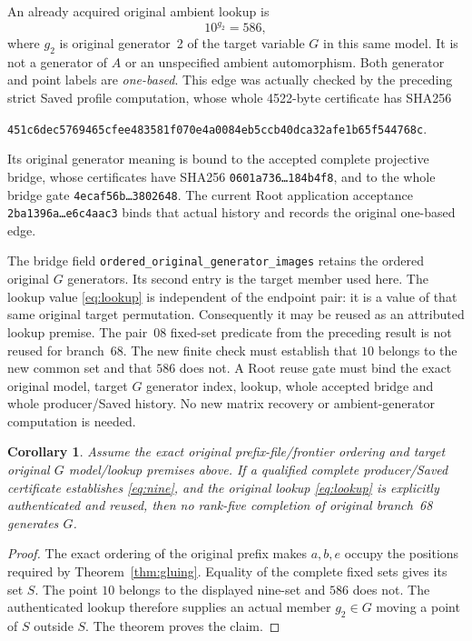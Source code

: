 \documentclass[11pt]{article}
\newtheorem{corollary}[theorem]{Corollary}
\begin{document}
An already acquired original ambient lookup is
\begin{equation}\label{eq:lookup}
            10^{g_2}=586,
\end{equation}
where $g_2$ is original generator~2 of the target variable $G$ in
this same model. It is not a generator of $A$ or an unspecified
ambient automorphism. Both generator
and point labels are \emph{one-based}. This edge was actually checked
by the preceding strict Saved profile computation, whose whole
4522-byte certificate has SHA256
\begin{center}\small
\texttt{451c6dec5769465cfee483581f070e4a0084eb5ccb40dca32afe1b65f544768c}.
\end{center}
Its original generator meaning is bound to the accepted complete
projective bridge, whose certificates have SHA256
\texttt{0601a736\ldots 184b4f8}, and to the whole bridge gate
\texttt{4ecaf56b\ldots 3802648}. The current Root application
acceptance \texttt{2ba1396a\ldots e6c4aac3} binds that actual
history and records the original one-based edge.

The bridge field \texttt{ordered\_original\_generator\_images}
retains the ordered original $G$ generators. Its second entry is
the target member used here. The lookup value \eqref{eq:lookup}
is independent of the endpoint pair: it is a value of that same
original target permutation.
Consequently it may be reused as an attributed lookup premise.
The pair~08 fixed-set predicate from the preceding result is not
reused for branch~68. The new finite check must establish that $10$
belongs to the new common set and that $586$ does not. A Root reuse
gate must bind the exact original model, target $G$ generator index,
lookup, whole accepted bridge and whole producer/Saved history.
No new matrix recovery or ambient-generator computation is needed.

\begin{corollary}\label{cor:branch68}
Assume the exact original prefix-file/frontier ordering and target
original $G$ model/lookup premises above.
If a qualified complete producer/Saved certificate establishes
\eqref{eq:nine}, and the original lookup \eqref{eq:lookup} is
explicitly authenticated and reused, then no rank-five completion of
original branch~68 generates $G$.
\end{corollary}
\begin{proof}
The exact ordering of the original prefix makes $a,b,e$ occupy the
positions required by Theorem~\ref{thm:gluing}. Equality of the
complete fixed sets gives its set $S$. The point $10$ belongs to
the displayed nine-set and $586$ does not. The authenticated lookup
therefore supplies an actual member $g_2\in G$ moving a point of
$S$ outside $S$. The theorem proves the claim.
\end{proof}
\end{document}
